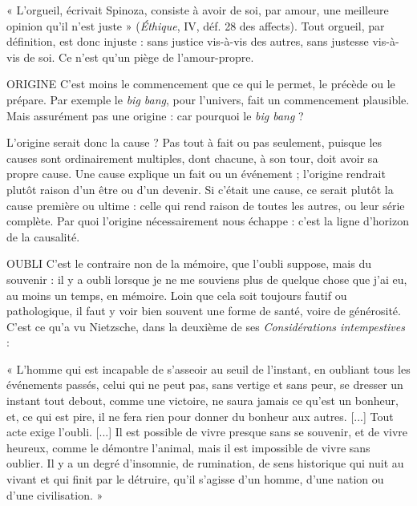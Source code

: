 « L’orgueil, écrivait Spinoza, consiste à avoir de soi, par amour, une
meilleure opinion qu’il n’est juste » ({\it Éthique}, IV, déf. 28 des affects). Tout
orgueil, par définition, est donc injuste : sans justice vis-à-vis des autres, sans
justesse vis-à-vis de soi. Ce n’est qu’un piège de l’amour-propre.

ORIGINE C’est moins le commencement que ce qui le permet, le précède
ou le prépare. Par exemple le {\it big bang}, pour l’univers, fait un
commencement plausible. Mais assurément pas une origine : car pourquoi le
{\it big bang} ?

L'origine serait donc la cause ? Pas tout à fait ou pas seulement, puisque les
causes sont ordinairement multiples, dont chacune, à son tour, doit avoir sa
propre cause. Une cause explique un fait ou un événement ; l’origine rendrait
plutôt raison d’un être ou d’un devenir. Si c'était une cause, ce serait plutôt la
cause première ou ultime : celle qui rend raison de toutes les autres, ou leur
série complète. Par quoi l’origine nécessairement nous échappe : c’est la ligne
d’horizon de la causalité.

OUBLI C’est le contraire non de la mémoire, que l'oubli suppose, mais du
souvenir : il y a oubli lorsque je ne me souviens plus de quelque
chose que j'ai eu, au moins un temps, en mémoire. Loin que cela soit toujours
fautif ou pathologique, il faut y voir bien souvent une forme de santé, voire de
générosité. C’est ce qu’a vu Nietzsche, dans la deuxième de ses {\it Considérations
intempestives} :

\vspace{0.5cm}

{\footnotesize 

« L'homme qui est incapable de s'asseoir au seuil de l'instant, en oubliant tous les
événements passés, celui qui ne peut pas, sans vertige et sans peur, se dresser un instant
tout debout, comme une victoire, ne saura jamais ce qu'est un bonheur, et, ce qui est
pire, il ne fera rien pour donner du bonheur aux autres. [...] Tout acte exige l’oubli.
[...] Il est possible de vivre presque sans se souvenir, et de vivre heureux, comme le
démontre l’animal, mais il est impossible de vivre sans oublier. Il y a un degré
d’insomnie, de rumination, de sens historique qui nuit au vivant et qui finit par le
détruire, qu’il s'agisse d’un homme, d’une nation ou d’une civilisation. »

}

\vspace{0.5cm}


